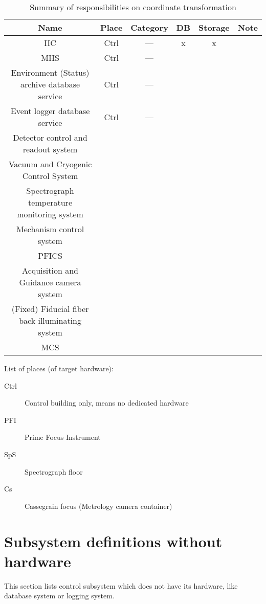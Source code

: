 \documentclass[a4paper,notitlepage]{article}
\begin{document}
\begin{table}[htb]
\caption{Summary of responsibilities on coordinate transformation}
\label{summary-list-subsystem}
\begin{center}
\begin{tabular}{c||c|c||c|c||l}
Name & Place & Category & DB & Storage & Note \\
\hline
IIC & Ctrl & --- & x & x &  \\
MHS & Ctrl & --- &   &   &  \\
Environment (Status) archive database service & Ctrl & --- &   &   &  \\
Event logger database service & Ctrl & --- &   &   &  \\
Detector control and readout system &  &  &   &   &  \\
Vacuum and Cryogenic Control System &  &  &   &   &  \\
Spectrograph temperature monitoring system &  &  &   &   &  \\
Mechanism control system &  &  &   &   &  \\
PFICS &  &  &   &   &  \\
Acquisition and Guidance camera system &  &  &   &   &  \\
(Fixed) Fiducial fiber back illuminating system &  &  &   &   &  \\
MCS &  &  &   &   &  \\
\end{tabular}
\end{center}
\end{table}

List of places (of target hardware):
\begin{description}
  \item[Ctrl] Control building only, means no dedicated hardware
  \item[PFI] Prime Focus Instrument
  \item[SpS] Spectrograph floor
  \item[Cs] Cassegrain focus (Metrology camera container)
\end{description}

\section{Subsystem definitions without hardware}

This section lists control subsystem which does not have its hardware, 
like database system or logging system. 
\end{document}
